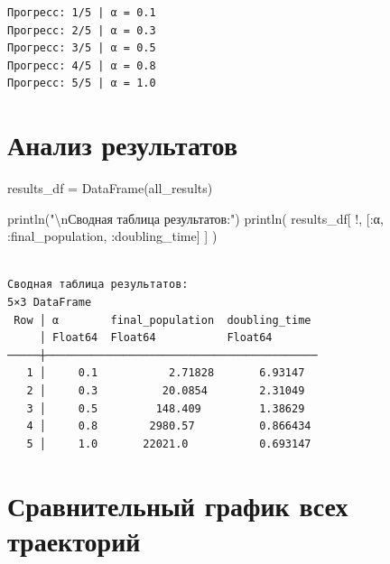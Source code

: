 \documentclass[
  russian,
  12pt,
  a4paper,
  DIV=11,
  numbers=noendperiod]{scrreprt}
\newenvironment{Shaded}{\begin{snugshade}}{\end{snugshade}}
\newcommand{\FunctionTok}[1]{\textcolor[rgb]{0.28,0.35,0.67}{#1}}
\newcommand{\NormalTok}[1]{\textcolor[rgb]{0.00,0.23,0.31}{#1}}
\newcommand{\OperatorTok}[1]{\textcolor[rgb]{0.37,0.37,0.37}{#1}}
\newcommand{\SpecialCharTok}[1]{\textcolor[rgb]{0.37,0.37,0.37}{#1}}
\newcommand{\StringTok}[1]{\textcolor[rgb]{0.13,0.47,0.30}{#1}}
\begin{document}
\begin{verbatim}
Прогресс: 1/5 | α = 0.1
Прогресс: 2/5 | α = 0.3
Прогресс: 3/5 | α = 0.5
Прогресс: 4/5 | α = 0.8
Прогресс: 5/5 | α = 1.0
\end{verbatim}

\section{Анализ
результатов}\label{ux430ux43dux430ux43bux438ux437-ux440ux435ux437ux443ux43bux44cux442ux430ux442ux43eux432}

\begin{Shaded}
\begin{Highlighting}[]
\NormalTok{results\_df }\OperatorTok{=} \FunctionTok{DataFrame}\NormalTok{(all\_results)}

\FunctionTok{println}\NormalTok{(}\StringTok{"}\SpecialCharTok{\textbackslash{}n}\StringTok{Сводная таблица результатов:"}\NormalTok{)}
\FunctionTok{println}\NormalTok{(}
\NormalTok{    results\_df[}
\NormalTok{        !,}
\NormalTok{        [}\OperatorTok{:}\NormalTok{α, }\OperatorTok{:}\NormalTok{final\_population, }\OperatorTok{:}\NormalTok{doubling\_time]}
\NormalTok{    ]}
\NormalTok{)}
\end{Highlighting}
\end{Shaded}

\begin{verbatim}

Сводная таблица результатов:
5×3 DataFrame
 Row │ α        final_population  doubling_time 
     │ Float64  Float64           Float64       
─────┼──────────────────────────────────────────
   1 │     0.1           2.71828       6.93147
   2 │     0.3          20.0854        2.31049
   3 │     0.5         148.409         1.38629
   4 │     0.8        2980.57          0.866434
   5 │     1.0       22021.0           0.693147
\end{verbatim}

\section{Сравнительный график всех
траекторий}\label{ux441ux440ux430ux432ux43dux438ux442ux435ux43bux44cux43dux44bux439-ux433ux440ux430ux444ux438ux43a-ux432ux441ux435ux445-ux442ux440ux430ux435ux43aux442ux43eux440ux438ux439}
\end{document}
